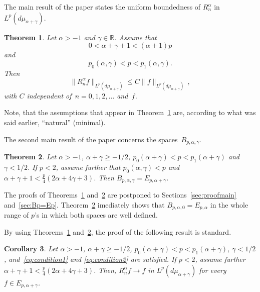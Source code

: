 \documentclass[a4paper]{amsart}
\newcommand{\muag}{d\mu_{\alpha+\gamma}}
\newtheorem{theor}{Theorem}
\newtheorem{corol}[theor]{Corollary}
\begin{document}
The main result of the paper states the uniform boundedness of
$R_n^\alpha$ in $L^p(\muag)$.

\begin{theor}
\label{th:main}
Let $\alpha > -1$ and $\gamma\in\mathbb{R}$. Assume that
\begin{equation}
\label{eq:condition1}
  0 < \alpha+\gamma+1 < (\alpha+1)p
\end{equation}
and
\begin{equation}
\label{eq:condition2}
  p_0(\alpha,\gamma) < p < p_1(\alpha,\gamma).
\end{equation}
Then
\begin{equation*}
  \|R_n^\alpha f\|_{L^p(\muag)} \le C \|f\|_{L^p(\muag)}\,,
\end{equation*}
with $C$ independent of~$n=0,1,2,\dots$ and~$f$.
\end{theor}

Note, that the assumptions that appear in Theorem~\ref{th:main} are,
according to what was said earlier, ``natural'' (minimal).

The second main result of the paper concerns the spaces~$B_{p,\alpha,\gamma}$.

\begin{theor}
\label{th:Bp=Ep} Let $\alpha > -1$, $\alpha+\gamma\ge-1/2$,
$p_0(\alpha+\gamma)<p<p_1(\alpha+\gamma)$ and $\gamma<1/2$.
If $p<2$, assume further that
$p_0(\alpha,\gamma)<p$
and $\alpha+\gamma+1<\frac{p}4(2\alpha+4\gamma+3)$.
Then $B_{p,\alpha,\gamma} = E_{p,\alpha+\gamma}$.
\end{theor}

The proofs of Theorems~\ref{th:main} and~\ref{th:Bp=Ep} are postponed to
Sections~\ref{sec:proofmain} and~\ref{sec:Bp=Ep}. Theorem~\ref{th:Bp=Ep} imediately
shows that $B_{p,\alpha,0}=E_{p,\alpha}$ in the whole range of $p$'s in
which both spaces are well defined.

By using Theorems~\ref{th:main} and~\ref{th:Bp=Ep}, the proof of the
following result is standard.

\begin{corol}
Let $\alpha > -1$, $\alpha+\gamma\ge-1/2$,
$p_0(\alpha+\gamma)<p<p_1(\alpha+\gamma)$, $\gamma<1/2$,
and~\eqref{eq:condition1} and
\eqref{eq:condition2} are satisfied. If
$p<2$, assume further $\alpha+\gamma+1<\frac{p}4(2\alpha+4\gamma+3)$.
Then, $R_n^\alpha f\to f$ in
$L^{p}(\muag)$ for every $f\in E_{p,\alpha+\gamma}$.
\end{corol}
\end{document}

